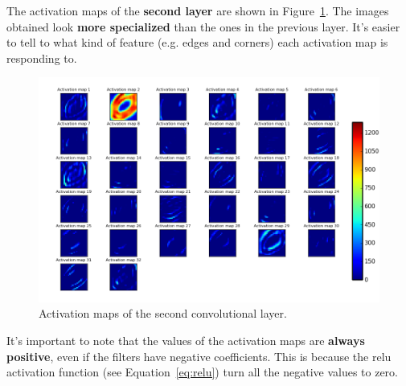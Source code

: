 The activation maps of the \textbf{second layer} are shown in Figure~\ref{fig:activation_maps2}. The images obtained look \textbf{more specialized} than the ones in the previous layer. It's easier to tell to what kind of feature (e.g. edges and corners) each activation map is responding to.
\begin{figure}
	\centering
	\includegraphics[width=0.9\linewidth, keepaspectratio]{figures/activation_maps_conv2d_2.png}
	\caption{Activation maps of the second convolutional layer.}
	\label{fig:activation_maps2}
\end{figure}

It's important to note that the values of the activation maps are \textbf{always positive}, even if the filters have negative coefficients. This is because the \gls{relu} activation function (see Equation~\ref{eq:relu}) turn all the negative values to zero.

